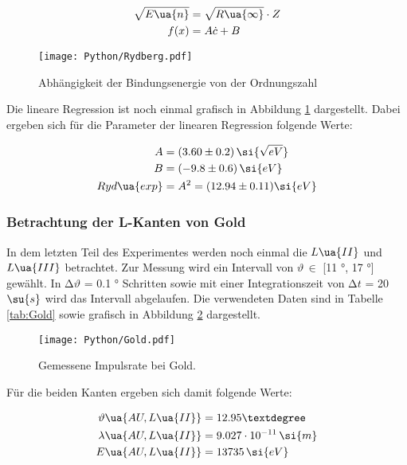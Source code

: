 \begin{align}
  \label{eqn:RydbergFit1}
  \sqrt{E\ua{n}} &=  \sqrt{R\ua{\infty}} \cdot Z  \\
  \label{eqn:RydbergFit2}
  f(x) &= A \dot c + B
\end{align}

\begin{figure}
  \centering
  \texttt{[image: Python/Rydberg.pdf]}
  \caption{Abhängigkeit der Bindungsenergie von der Ordnungszahl}
  \label{fig:Rydberg}
\end{figure}

Die lineare Regression ist noch einmal grafisch in Abbildung \ref{fig:Rydberg}
dargestellt. Dabei ergeben sich für die Parameter der linearen Regression
folgende Werte:

\begin{align*}
  A &= (3.60 \pm 0.2) \, \si{\sqrt{eV}} \\
  B &= (-9.8 \pm 0.6) \, \si{eV} \\
  Ryd\ua{exp} &= A^2 = (12.94 \pm 0.11) \si{eV}
\end{align*}

\newpage %

\subsubsection{Betrachtung der L-Kanten von Gold}

In dem letzten Teil des Experimentes werden noch einmal die $L\ua{II}$ und
$L\ua{III}$ betrachtet. Zur Messung wird ein Intervall von $\vartheta \, \in$
 [11 °, 17 °] gewählt. In $\increment \vartheta$ = 0.1 ° Schritten sowie mit einer
Integrationszeit von $\increment t$ = 20 $\su{s}$ wird das Intervall abgelaufen.
Die verwendeten Daten sind in
Tabelle \ref{tab:Gold} sowie grafisch in Abbildung \ref{fig:Gold} dargestellt.



\begin{figure}
  \centering
  \texttt{[image: Python/Gold.pdf]}
  \caption{Gemessene Impulsrate bei Gold.}
  \label{fig:Gold}
\end{figure}

Für die beiden Kanten ergeben sich damit folgende Werte:

\begin{align*}
  \vartheta\ua{AU,L\ua{II}} &= 12.95 ° \\
  \lambda\ua{AU,L\ua{II}} &= 9.027 \cdot 10^{-11} \, \si{m} \\
  E\ua{AU,L\ua{II}} &= 13735 \, \si{eV}
\end{align*}

